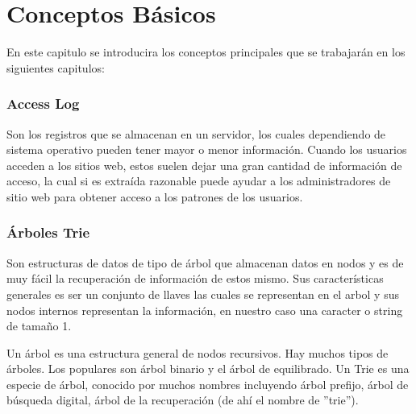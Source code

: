 \chapter[Conceptos Básicos]{Conceptos Básicos}
\label{ch:Conceptos-Basicos}





En este capitulo se introducira los conceptos principales que se trabajarán en los siguientes capitulos:




\subsection{Access Log}

Son los registros que se almacenan en un servidor, los cuales dependiendo de sistema operativo pueden tener mayor o menor información. Cuando los usuarios acceden a los sitios web, estos  suelen dejar una gran cantidad de información de acceso, la cual si es extraída razonable puede ayudar a los administradores de sitio web para obtener acceso a los patrones de los usuarios. 


\subsection{Árboles Trie}



Son estructuras de datos de tipo de árbol que almacenan datos en nodos y es de muy fácil la recuperación de información de estos mismo. Sus características generales es ser un conjunto de llaves las cuales se representan en el arbol y sus nodos internos representan la información, en nuestro caso una caracter o string de tamaño 1.

Un árbol es una estructura general de nodos recursivos. Hay muchos tipos de árboles. Los populares son árbol binario y el árbol de equilibrado. Un Trie es una especie de árbol, conocido por muchos nombres incluyendo árbol prefijo, árbol de búsqueda digital, árbol de la recuperación (de ahí el nombre de ''trie'').


